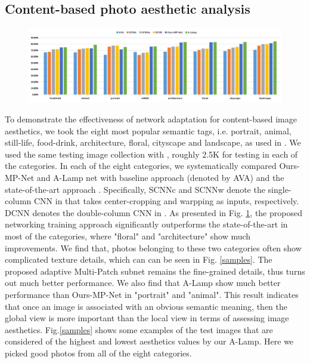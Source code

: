 \documentclass[10pt,twocolumn,letterpaper]{article}
\begin{document}

\subsection{Content-based photo aesthetic analysis}

\begin{figure}
	\centering
	\includegraphics[scale=0.5]{figures/category.jpg}
	\label{category}
\end{figure}

To demonstrate the effectiveness of network adaptation for content-based image aesthetics, we took the eight most popular semantic tags, i.e. portrait, animal, still-life, food-drink, architecture, floral, cityscape and landscape, as used in \cite{Murray:MMP2012:AVA}. We used the same testing image collection with \cite{Lu:2014:TMM:rating}, roughly 2.5K for testing in each of the categories.
In each of the eight categories, we systematically compared
Ours-MP-Net and A-Lamp net with baseline approach \cite{Murray:MMP2012:AVA} (denoted by AVA) and the state-of-the-art approach \cite{Lu:2014:TMM:rating}. Specifically, SCNN{\tiny c} and SCNN{\tiny w} denote the single-column CNN in \cite{Lu:2014:TMM:rating} that takes center-cropping and warpping as inputs, respectively. DCNN denotes the double-column CNN in \cite{Lu:2014:TMM:rating}.
As presented in Fig. \ref*{category}, the proposed networking training approach significantly outperforms the state-of-the-art in most of the categories, where "floral" and "architecture" show much improvements. We find that, photos belonging to these two categories often show complicated texture details, which can can be seen in Fig. \ref{samples}. The proposed adaptive Multi-Patch subnet remains the fine-grained details, thus turns out much better performance. We also find that A-Lamp show much better performance than Ours-MP-Net in "portrait" and "animal". This result indicates that once an image is associated with an obvious semantic meaning, then the global view is more important than the local view in terms of assessing image aesthetics. Fig.\ref{samples} shows some examples of the test images that are considered of the highest and lowest aesthetics values by our A-Lamp. Here we picked good photos from all of the eight categories.
\end{document}
